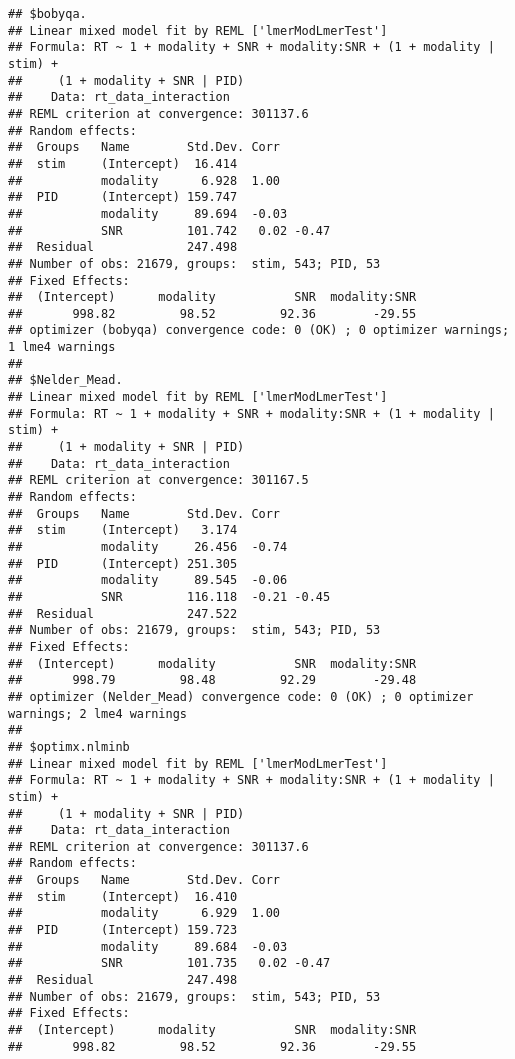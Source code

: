 \documentclass[
]{article}
\begin{document}
\begin{verbatim}
## $bobyqa.
## Linear mixed model fit by REML ['lmerModLmerTest']
## Formula: RT ~ 1 + modality + SNR + modality:SNR + (1 + modality | stim) +  
##     (1 + modality + SNR | PID)
##    Data: rt_data_interaction
## REML criterion at convergence: 301137.6
## Random effects:
##  Groups   Name        Std.Dev. Corr       
##  stim     (Intercept)  16.414             
##           modality      6.928  1.00       
##  PID      (Intercept) 159.747             
##           modality     89.694  -0.03      
##           SNR         101.742   0.02 -0.47
##  Residual             247.498             
## Number of obs: 21679, groups:  stim, 543; PID, 53
## Fixed Effects:
##  (Intercept)      modality           SNR  modality:SNR  
##       998.82         98.52         92.36        -29.55  
## optimizer (bobyqa) convergence code: 0 (OK) ; 0 optimizer warnings; 1 lme4 warnings 
## 
## $Nelder_Mead.
## Linear mixed model fit by REML ['lmerModLmerTest']
## Formula: RT ~ 1 + modality + SNR + modality:SNR + (1 + modality | stim) +  
##     (1 + modality + SNR | PID)
##    Data: rt_data_interaction
## REML criterion at convergence: 301167.5
## Random effects:
##  Groups   Name        Std.Dev. Corr       
##  stim     (Intercept)   3.174             
##           modality     26.456  -0.74      
##  PID      (Intercept) 251.305             
##           modality     89.545  -0.06      
##           SNR         116.118  -0.21 -0.45
##  Residual             247.522             
## Number of obs: 21679, groups:  stim, 543; PID, 53
## Fixed Effects:
##  (Intercept)      modality           SNR  modality:SNR  
##       998.79         98.48         92.29        -29.48  
## optimizer (Nelder_Mead) convergence code: 0 (OK) ; 0 optimizer warnings; 2 lme4 warnings 
## 
## $optimx.nlminb
## Linear mixed model fit by REML ['lmerModLmerTest']
## Formula: RT ~ 1 + modality + SNR + modality:SNR + (1 + modality | stim) +  
##     (1 + modality + SNR | PID)
##    Data: rt_data_interaction
## REML criterion at convergence: 301137.6
## Random effects:
##  Groups   Name        Std.Dev. Corr       
##  stim     (Intercept)  16.410             
##           modality      6.929  1.00       
##  PID      (Intercept) 159.723             
##           modality     89.684  -0.03      
##           SNR         101.735   0.02 -0.47
##  Residual             247.498             
## Number of obs: 21679, groups:  stim, 543; PID, 53
## Fixed Effects:
##  (Intercept)      modality           SNR  modality:SNR  
##       998.82         98.52         92.36        -29.55  

\end{verbatim}
\end{document}
